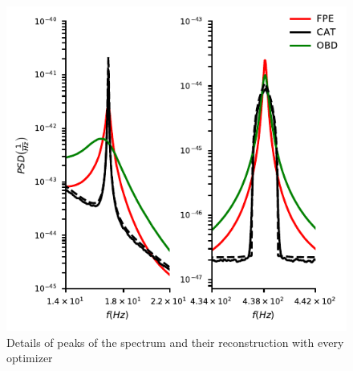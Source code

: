 \documentclass[twocolumn,showpacs,preprintnumbers,nofootinbib,prd,
superscriptaddress,10pt]{revtex4-1}
\begin{document}
\begin{figure}[t]
        \includegraphics[width = \linewidth]{Images/optimisers_comparison/ligo/compare_estimates_peaks.pdf}
        \caption{Details of peaks of the spectrum and their reconstruction with every optimizer}
        \label{fig:ligoPeaks}
\end{figure}
\end{document}
